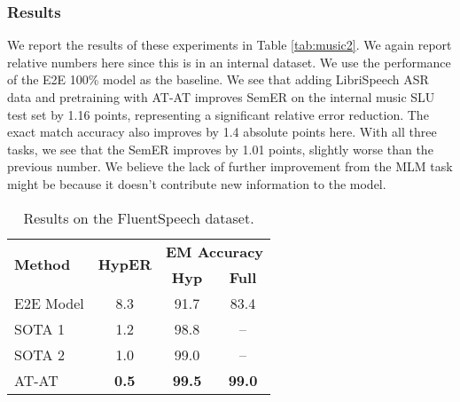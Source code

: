 \documentclass[letterpaper]{article} \usepackage{aaai21}  \usepackage{times}  \usepackage{helvet} \usepackage{courier}  \usepackage[hyphens]{url}  \usepackage{graphicx} \usepackage{booktabs}
\begin{document}
\subsubsection{Results}
We report the results of these experiments in Table \ref{tab:music2}. We again report relative numbers here since this is in an internal dataset. We use the performance of the E2E 100\% model as the baseline. We see that adding LibriSpeech ASR data and pretraining with AT-AT improves SemER on the internal music SLU test set by 1.16 points, representing a significant relative error reduction. The exact match accuracy also improves by 1.4 absolute points here. With all three tasks, we see that the SemER improves by 1.01 points, slightly worse than the previous number. We believe the lack of further improvement from the MLM task might be because it doesn't contribute new information to the model.

\begin{table}
\begin{tabular}{lccc}
\toprule
\multirow{2}{*}{\bf{Method}} & \multirow{2}{*}{\bf{HypER}} & \multicolumn{2}{c}{\bf{EM Accuracy}} \\
& & \bf{Hyp} & \bf{Full} \\ 
\midrule
E2E Model & 8.3 & 91.7 & 83.4 \\
SOTA 1 \cite{Lugosch2019SpeechMP} & 1.2 & 98.8 & -- \\
SOTA 2 \cite{wang2020large} & 1.0 & 99.0 & -- \\
AT-AT & \bf 0.5 & \bf 99.5 & \bf 99.0 \\
\bottomrule
\end{tabular}
\caption{
    Results on the FluentSpeech dataset. 
}
\label{tab:flsp}
\end{table}
\end{document}
